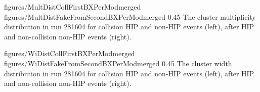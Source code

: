                  {figures/MultDistCollFirstBXPerModmerged} %
                 {figures/MultDistFakeFromSecondBXPerModmerged} %
                 {0.45}       %
                 { The cluster multiplicity distribution in run 281604 for collision HIP and non-HIP events (left), after HIP and non-collision non-HIP events (right). } %

                 {figures/WiDistCollFirstBXPerModmerged} %
                 {figures/WiDistFakeFromSecondBXPerModmerged} %
                 {0.45}       %
                 {  The cluster width distribution in run 281604 for collision HIP and non-HIP events (left), after HIP and non-collision non-HIP events (right).} %


\begin{table}
\begin{center}
\caption[Table caption text]{The average cluster charge, multiplicity, width and the fraction of clusters larger than 10 strips for four categories defined in Table~\ref{tab:eventCategories} for run 281604. These quantities are computed from both on-track and off-track clusters.}
\label{tab:clusterCategories}
\end{center}
\end{table}

